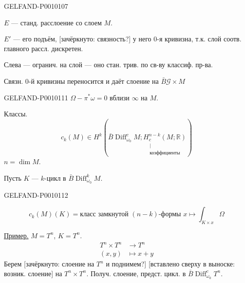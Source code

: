 \begin{GelfandAdjacentEvidence}{GELFAND-P001010}{7}


$E$ --- станд. расслоение со слоем $M$.

$E'$ --- его подъём, [зачёркнуто: связность?] у него $0$-я кривизна,
т.к. слой соотв. главного рассл. дискретен.
\end{GelfandAdjacentEvidence}


Слева --- огранич. на слой --- оно стан. трив. по св-ву классиф. пр-ва.

Связн. $0$-й кривизны переносится и даёт слоение на $\bar B\mathcal G\times M$


\begin{GelfandAdjacentEvidence}{GELFAND-P001011}{1}
$\Omega-\pi^*\omega=0$ вблизи $\infty$ на $M$.

Классы.
\[
c_k(M)\in H^k\left(\bar B\operatorname{Diff}^{c}_{\omega_0}M;
\underset{\substack{\vert\\\text{коэффициенты}}}{H_c^{n-k}(M;\mathbb R)}\right)
\]
$n=\dim M$.

Пусть $K$ --- $k$-цикл в $\bar B\operatorname{Diff}^{k}_{\omega_0}M$.
\end{GelfandAdjacentEvidence}
\begin{GelfandAdjacentEvidence}{GELFAND-P001011}{2}

\[
c_k(M)(K)=\text{класс замкнутой }(n-k)\text{-формы }
 x\longmapsto\int_{K\times x}\Omega
\]

\underline{Пример.} $M=T^n$, $K=T^n$.
\[
\begin{aligned}
T^n\times T^n&\longrightarrow T^n\\
(x,y)&\longmapsto x+y
\end{aligned}
\]
Берем [зачёркнуто: слоение на $T^n$ и поднимем?] [вставлено сверху в выноске: возник. слоение]
на $T^n\times T^n$. Получ. слоение, предст. цикл. в $\bar B\operatorname{Diff}^{c}_{\omega_0}T^n$.
\end{GelfandAdjacentEvidence}

